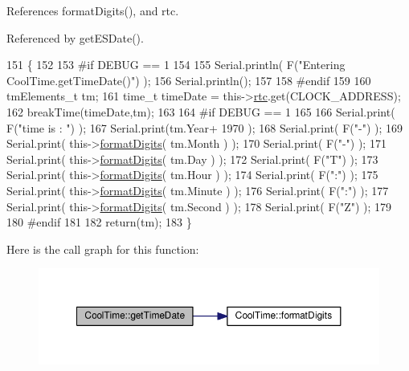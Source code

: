 References format\+Digits(), and rtc.



Referenced by get\+E\+S\+Date().


\begin{DoxyCode}
151 \{
152 
153 \textcolor{preprocessor}{#if DEBUG == 1 }
154     
155     Serial.println( F(\textcolor{stringliteral}{"Entering CoolTime.getTimeDate()"}) );
156     Serial.println();
157 
158 \textcolor{preprocessor}{#endif}
159 
160     tmElements\_t tm;
161     time\_t timeDate = this->\hyperlink{classCoolTime_abd38f2384ff90692b1568d9db869412e}{rtc}.get(CLOCK\_ADDRESS);
162     breakTime(timeDate,tm);
163 
164 \textcolor{preprocessor}{#if DEBUG == 1}
165     
166     Serial.print( F(\textcolor{stringliteral}{"time is : "}) );
167     Serial.print(tm.Year+ 1970 );
168     Serial.print( F(\textcolor{stringliteral}{"-"}) );
169     Serial.print( this->\hyperlink{classCoolTime_acd537cd4210d7bde4e1f5c47d2ac0456}{formatDigits}( tm.Month ) );
170     Serial.print( F(\textcolor{stringliteral}{"-"}) );
171     Serial.print( this->\hyperlink{classCoolTime_acd537cd4210d7bde4e1f5c47d2ac0456}{formatDigits}( tm.Day ) );
172     Serial.print( F(\textcolor{stringliteral}{"T"}) );
173     Serial.print( this->\hyperlink{classCoolTime_acd537cd4210d7bde4e1f5c47d2ac0456}{formatDigits}( tm.Hour ) );
174     Serial.print( F(\textcolor{stringliteral}{":"}) );
175     Serial.print( this->\hyperlink{classCoolTime_acd537cd4210d7bde4e1f5c47d2ac0456}{formatDigits}( tm.Minute ) );
176     Serial.print( F(\textcolor{stringliteral}{":"}) );
177     Serial.print( this->\hyperlink{classCoolTime_acd537cd4210d7bde4e1f5c47d2ac0456}{formatDigits}( tm.Second ) );
178     Serial.print( F(\textcolor{stringliteral}{"Z"}) );
179 
180 \textcolor{preprocessor}{#endif}
181     
182     \textcolor{keywordflow}{return}(tm);
183 \}
\end{DoxyCode}
Here is the call graph for this function\+:
\nopagebreak
\begin{figure}[H]
\begin{center}
\leavevmode
\includegraphics[width=350pt]{classCoolTime_a7a7501c5ca77dd1248bea704c44f986c_cgraph}
\end{center}
\end{figure}
